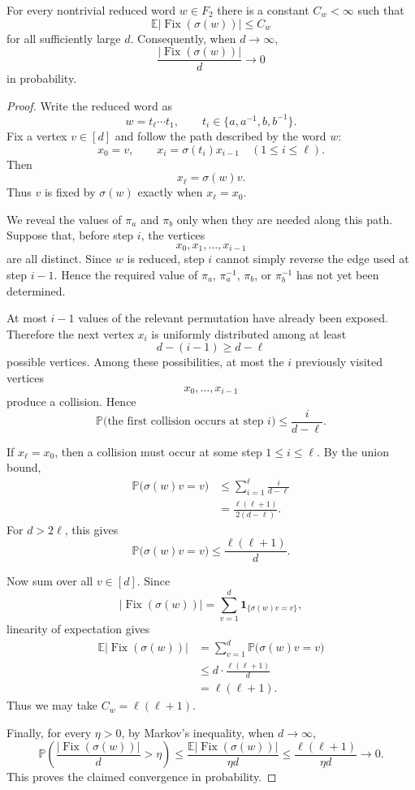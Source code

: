 \documentclass[10pt,a4paper]{amsart}
\newcommand{\Fix}{\operatorname{Fix}}
\begin{document}
	\begin{lemma}\label{lem:random-free}
		For every nontrivial reduced word $w\in F_2$ there is a constant $C_w<\infty$ such that
		\[
		\mathbb E|\Fix(\sigma(w))|\le C_w
		\]
		for all sufficiently large $d$.  Consequently, when $d\longrightarrow\infty$,
		\[
		\frac{|\Fix(\sigma(w))|}{d}\longrightarrow0
		\]
		in probability.
	\end{lemma}

	\begin{proof}
Write the reduced word as
\[
w=t_\ell\cdots t_1,
\qquad
 t_i\in\{a,a^{-1},b,b^{-1}\}.
\]
Fix a vertex $v\in[d]$ and follow the path described by the word $w$:
\[
x_0=v,
\qquad
x_i=\sigma(t_i)x_{i-1}
\quad(1\leq i\leq\ell).
\]
Then
\[
x_\ell=\sigma(w)v.
\]
Thus $v$ is fixed by $\sigma(w)$ exactly when $x_\ell=x_0$.

We reveal the values of $\pi_a$ and $\pi_b$ only when they are needed along
this path. Suppose that, before step $i$, the vertices
\[
x_0,x_1,\ldots,x_{i-1}
\]
are all distinct. Since $w$ is reduced, step $i$ cannot simply reverse the
edge used at step $i-1$. Hence the required value of $\pi_a$, $\pi_a^{-1}$,
$\pi_b$, or $\pi_b^{-1}$ has not yet been determined.

At most $i-1$ values of the relevant permutation have already been exposed.
Therefore the next vertex $x_i$ is uniformly distributed among at least
\[
d-(i-1)\geq d-\ell
\]
possible vertices. Among these possibilities, at most the $i$ previously
visited vertices
\[
x_0,\ldots,x_{i-1}
\]
produce a collision. Hence
\[
\mathbb P\bigl(\text{the first collision occurs at step }i\bigr)
\leq \frac{i}{d-\ell}.
\]

If $x_\ell=x_0$, then a collision must occur at some step
$1\leq i\leq\ell$. By the union bound,
\[
\begin{aligned}
\mathbb P\bigl(\sigma(w)v=v\bigr)
&\leq
\sum_{i=1}^{\ell}\frac{i}{d-\ell}\\
&=
\frac{\ell(\ell+1)}{2(d-\ell)}.
\end{aligned}
\]
For $d>2\ell$, this gives
\[
\mathbb P\bigl(\sigma(w)v=v\bigr)
\leq \frac{\ell(\ell+1)}{d}.
\]

Now sum over all $v\in[d]$. Since
\[
|\Fix(\sigma(w))|
=
\sum_{v=1}^{d}\mathbf 1_{\{\sigma(w)v=v\}},
\]
linearity of expectation gives
\[
\begin{aligned}
\mathbb E|\Fix(\sigma(w))|
&=
\sum_{v=1}^{d}\mathbb P\bigl(\sigma(w)v=v\bigr)\\
&\leq
 d\cdot\frac{\ell(\ell+1)}{d}\\
&=
\ell(\ell+1).
\end{aligned}
\]
Thus we may take $C_w=\ell(\ell+1)$.

Finally, for every $\eta>0$, by Markov's inequality, when $d \longrightarrow \infty$, 
\[
\mathbb P\left(
\frac{|\Fix(\sigma(w))|}{d}>\eta
\right)
\leq
\frac{\mathbb E|\Fix(\sigma(w))|}{\eta d}
\leq
\frac{\ell(\ell+1)}{\eta d}
\longrightarrow0.
\]
This proves the claimed convergence in probability.
\end{proof}
\end{document}
